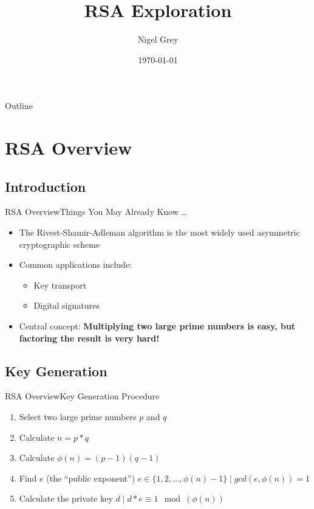 \documentclass[presentation]{beamer}
\author{Nigel Grey}
\date{\today}
\title{RSA Exploration}
\begin{document}
\maketitle
\begin{frame}{Outline}
  \tableofcontents
\end{frame}
\section{RSA Overview}
\subsection{Introduction}
\begin{frame}{RSA Overview}{Things You May Already Know \ldots}
  \begin{itemize}
    \item The Rivest-Shamir-Adleman algorithm is the most widely used asymmetric
      cryptographic scheme
      \pause
    \item Common applications include:
      \begin{itemize}
        \item Key transport
        \item Digital signatures
      \end{itemize}
      \pause
    \item Central concept: \textbf{Multiplying two large prime numbers is easy,
      but factoring the result is very hard!}
  \end{itemize}
\end{frame}
\subsection{Key Generation}
\begin{frame}{RSA Overview}{Key Generation Procedure}
  \begin{enumerate}
    \item Select two large prime numbers $p$ and $q$
      \pause
    \item Calculate $n=p*q$
      \pause
    \item Calculate $\phi(n)=(p-1)(q-1)$
      \pause
    \item Find $e$ (the ``public exponent'') $e \in \{1,2,\ldots,\phi(n)-1\}
      \mid gcd(e,\phi(n))=1$
      \pause
    \item Calculate the private key $d \mid d*e \equiv 1\mod(\phi(n))$
  \end{enumerate}
\end{frame}
\end{document}
